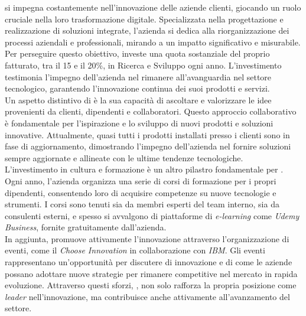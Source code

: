 \noindent{\azienda} si impegna costantemente nell'innovazione delle aziende clienti, giocando un ruolo cruciale nella loro trasformazione digitale. 
Specializzata nella progettazione e realizzazione di soluzioni integrate, l'azienda si dedica alla riorganizzazione dei processi aziendali e 
professionali, mirando a un impatto significativo e misurabile. \\
\noindent Per perseguire questo obiettivo, {\azienda} investe una quota sostanziale del proprio fatturato, tra il 15 e il 20\%, 
in Ricerca e Sviluppo ogni anno. L'investimento testimonia l'impegno dell'azienda nel rimanere all'avanguardia nel settore tecnologico, 
garantendo l'innovazione continua dei suoi prodotti e servizi. \\
\noindent Un aspetto distintivo di {\azienda} è la sua capacità di ascoltare e valorizzare le idee provenienti da clienti, dipendenti e collaboratori. 
Questo approccio collaborativo è fondamentale per l'ispirazione e lo sviluppo di nuovi prodotti e soluzioni innovative. Attualmente, quasi tutti i 
prodotti installati presso i clienti sono in fase di aggiornamento, dimostrando l'impegno dell'azienda nel fornire soluzioni sempre aggiornate e 
allineate con le ultime tendenze tecnologiche. \\
\noindent L'investimento in cultura e formazione è un altro pilastro fondamentale per {\azienda}. Ogni anno, l'azienda organizza una serie di corsi 
di formazione per i propri dipendenti, consentendo loro di acquisire competenze su nuove tecnologie e strumenti. 
I corsi sono tenuti sia da membri esperti del team interno, sia da consulenti esterni, e spesso si avvalgono di piattaforme 
di \textit{e-learning} come \textit{Udemy Business}, fornite gratuitamente dall'azienda. \\
\noindent In aggiunta, {\azienda} promuove attivamente l'innovazione attraverso l'organizzazione di eventi, 
come il \textit{Choose Innovation} in collaborazione con \textit{IBM}. Gli eventi rappresentano un'opportunità per discutere di 
innovazione e di come le aziende possano adottare nuove strategie per rimanere competitive nel mercato in rapida evoluzione. 
Attraverso questi sforzi, {\azienda}, non solo rafforza la propria posizione come \textit{leader} nell'innovazione, ma contribuisce anche 
attivamente all'avanzamento del settore. \\